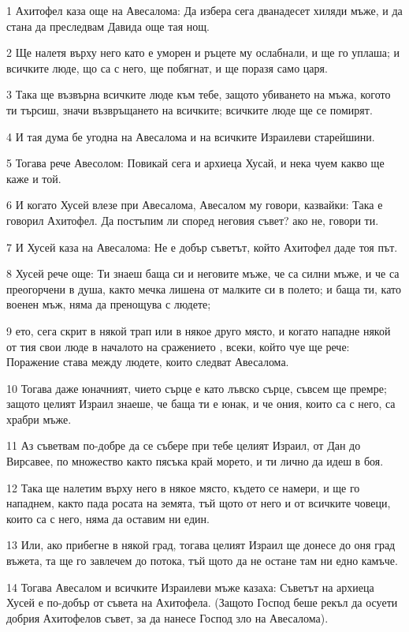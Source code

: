 \par 1 Ахитофел каза още на Авесалома: Да избера сега дванадесет хиляди мъже, и да стана да преследвам Давида още тая нощ.
\par 2 Ще налетя върху него като е уморен и ръцете му ослабнали, и ще го уплаша; и всичките люде, що са с него, ще побягнат, и ще поразя само царя.
\par 3 Така ще възвърна всичките люде към тебе, защото убиването на мъжа, когото ти търсиш, значи възвръщането на всичките; всичките люде ще се помирят.
\par 4 И тая дума бе угодна на Авесалома и на всичките Израилеви старейшини.
\par 5 Тогава рече Авесолом: Повикай сега и архиеца Хусай, и нека чуем какво ще каже и той.
\par 6 И когато Хусей влезе при Авесалома, Авесалом му говори, казвайки: Така е говорил Ахитофел. Да постъпим ли според неговия съвет? ако не, говори ти.
\par 7 И Хусей каза на Авесалома: Не е добър съветът, който Ахитофел даде тоя път.
\par 8 Хусей рече още: Ти знаеш баща си и неговите мъже, че са силни мъже, и че са преогорчени в душа, както мечка лишена от малките си в полето; и баща ти, като военен мъж, няма да пренощува с людете;
\par 9 ето, сега скрит в някой трап или в някое друго място, и когато нападне някой от тия свои люде в началото на сражението , всеки, който чуе ще рече: Поражение става между людете, които следват Авесалома.
\par 10 Тогава даже юначният, чието сърце е като лъвско сърце, съвсем ще премре; защото целият Израил знаеше, че баща ти е юнак, и че ония, които са с него, са храбри мъже.
\par 11 Аз съветвам по-добре да се събере при тебе целият Израил, от Дан до Вирсавее, по множество както пясъка край морето, и ти лично да идеш в боя.
\par 12 Така ще налетим върху него в някое място, където се намери, и ще го нападнем, както пада росата на земята, тъй щото от него и от всичките човеци, които са с него, няма да оставим ни един.
\par 13 Или, ако прибегне в някой град, тогава целият Израил ще донесе до оня град въжета, та ще го завлечем до потока, тъй щото да не остане там ни едно камъче.
\par 14 Тогава Авесалом и всичките Израилеви мъже казаха: Съветът на архиеца Хусей е по-добър от съвета на Ахитофела. (Защото Господ беше рекъл да осуети добрия Ахитофелов съвет, за да нанесе Господ зло на Авесалома).
